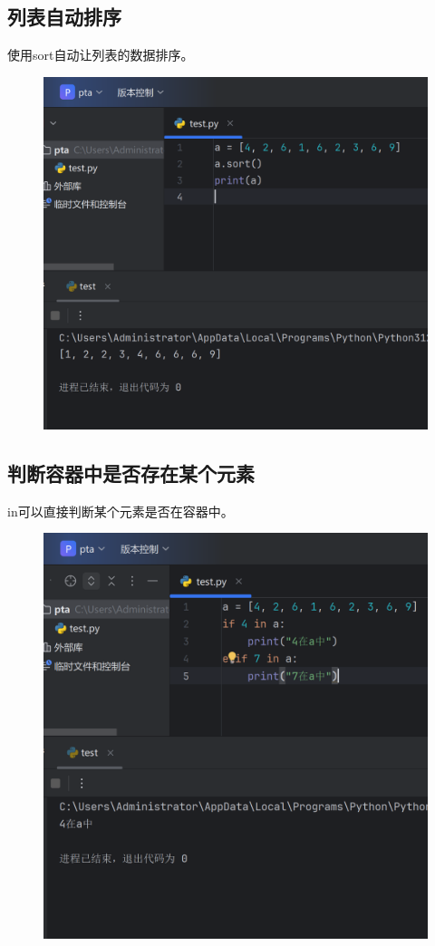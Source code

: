 \documentclass{article}
\begin{document}
\subsection{列表自动排序}
使用sort自动让列表的数据排序。
\begin{figure}[H]
    \centering
    \includegraphics[width=1\linewidth]{sort.png}
\end{figure}


\newpage
\subsection{判断容器中是否存在某个元素}
in可以直接判断某个元素是否在容器中。
\begin{figure}[H]
    \centering
    \includegraphics[width=1\linewidth]{in.png}
\end{figure}
\end{document}
